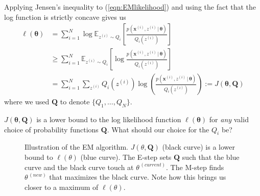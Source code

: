 \documentclass[final,3p,times,twocolumn]{elsarticle}
\let\bs\boldsymbol
\begin{document}
Applying Jensen's inequality to (\ref{eqn:EMlikelihood}) and using the fact that the log function is strictly concave gives us
\begin{equation}
\begin{split}
\ell(\bs\theta) &=  \sum_{i=1}^N \log \mathbb{E}_{z^{(i)} \sim Q_i}\left[\frac{p(\bs x^{(i)},z^{(i)}\,|\,\bs\theta)}{Q_i(z^{(i)})}\right]\\
&\geq \sum_{i=1}^N \mathbb{E}_{z^{(i)} \sim Q_i}\left[\log \frac{p(\bs x^{(i)},z^{(i)}\,|\,\bs\theta)}{Q_i(z^{(i)})}\right]\\ 
&= \sum_{i=1}^N \sum_{z^{(i)}} Q_i(z^{(i)}) \log \left(\frac{p(\bs x^{(i)},z^{(i)}\,|\,\bs\theta)}{Q_i(z^{(i)})}\right) := J(\bs\theta,\bs Q)
\end{split}
\end{equation}
where we used $\bs Q$ to denote $\{Q_1,\dots,Q_N\}$.

$J(\bs\theta,\bs Q)$ is a lower bound to the log likelihood function $\ell(\bs\theta)$ for \emph{any} valid choice of probability functions $\bs Q$.
What should our choice for the $Q_i$ be?



\begin{figure}
\caption{Illustration of the EM algorithm.
$J(\theta,\bs Q)$ (black curve) is a lower bound to $\ell(\theta)$ (blue curve).
The E-step sets $\bs Q$ such that the blue curve and the black curve touch at $\theta^{\,(current)}$.
The M-step finds $\theta^{\,(new)}$ that maximizes the black curve.
Note how this brings us closer to a maximum of $\ell(\theta)$.}
\label{fig:EM}
\end{figure}
\end{document}
